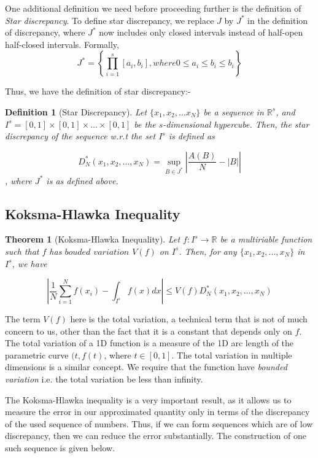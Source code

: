 \documentclass[12pt,letterpaper, twoside]{article}
\newtheorem{theorem}{Theorem}
\newtheorem{definition}{Definition}
\theoremstyle{definition}
\begin{document}
One additional definition we need before proceeding further is the definition of \emph{Star discrepancy}. To define star discrepancy, we replace $J$ by $J^*$ in the definition of discrepancy, where $J^*$ now includes only closed intervals instead of half-open half-closed intervals. Formally,  
$$
J^* = \left\{ \prod_{i=1}^{s} [a_i,b_i], where 0 \leq a_i \leq b_i \leq b_i \right\}
$$

Thus, we have the definition of star discrepancy:-

\begin{definition}[Star Discrepancy] \cite{kokshmaWikipedia}
Let $\{x_1,x_2,\ldots x_N\}$ be a sequence in $\mathbb{R}^s$, and $I^s = [0,1] \times [0,1] \times \ldots \times [0,1]$ be the $s$-dimensional hypercube. Then, the star discrepancy of the sequence w.r.t the set $I^s$ is defined as 

$$
D_N^*(x_1,x_2,\ldots,x_N) = \sup_{B \in J^*} \left| \frac{A(B)}{N} - |B|\right|
$$, where $J^*$ is as defined above.
\end{definition}
\subsection{Koksma-Hlawka Inequality}
\begin{theorem}[Koksma-Hlawka Inequality] \cite{owenReport}\cite{kokshmaWikipedia}
Let $f:I^s \to \mathbb{R}$ be a multiriable function such that $f$ has $bouded$ $variation$ $V(f)$ on $I^s$. Then, for any $\{x_1,x_2,\ldots ,x_N\}$ in $I^s$, we have

$$
\left|\frac{1}{N}\sum_{i=1}^{N} f(x_i) - \int_{I^s}f(x)dx\right| \leq V(f) D_N^*(x_1,x_2,\ldots,x_N)
$$
\end{theorem}

The term $V(f)$ here is the total variation, a technical term that is not of much concern to us, other than the fact that it is a constant that depends only on $f$. The total variation of a 1D function is a measure of the 1D arc length of the parametric curve $(t,f(t)$, where $t \in [0,1]$. The total variation in multiple dimensions is a similar concept. We require that the function have \emph{bounded variation} i.e. the total variation be less than infinity.

The Koksma-Hlawka inequality is a very important result, as it allows us to measure the error in our approximated quantity only in terms of the discrepancy of the used sequence of numbers. Thus, if we can form sequences which are of low discrepancy, then we can reduce the error substantially. The construction of one such sequence is given below.
\end{document}
